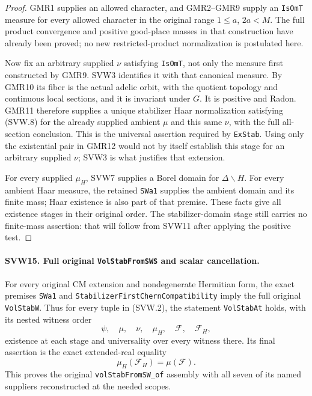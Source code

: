 \begin{proof}
GMR1 supplies an allowed character, and GMR2--GMR9 supply an
\texttt{IsOmT} measure for every allowed character in the original
range $1\leq a$, $2a<M$.  The full product convergence and positive
good-place masses in that construction have already been proved;
no new restricted-product normalization is postulated here.

Now fix an arbitrary supplied $\nu$ satisfying \texttt{IsOmT},
not only the measure first constructed by GMR9.  SVW3 identifies
it with that canonical measure.  By GMR10 its fiber is the actual
adelic orbit, with the quotient topology and continuous local
sections, and it is invariant under $G$.  It is positive and
Radon.  GMR11 therefore supplies a unique stabilizer Haar
normalization satisfying (SVW.8) for the already supplied ambient
$\mu$ and this same $\nu$, with the full all-section conclusion.
This is the universal assertion required by \texttt{ExStab}.
Using only the existential pair in GMR12 would not by itself
establish this stage for an arbitrary supplied $\nu$; SVW3 is what
justifies that extension.

For every supplied $\mu_H$, SVW7 supplies a Borel domain for
$\Delta\backslash H$.  For every ambient Haar measure, the
retained \texttt{SWa1} supplies the ambient domain and its finite
mass; Haar existence is also part of that premise.  These facts
give all existence stages in their original order.  The
stabilizer-domain stage still carries no finite-mass assertion:
that will follow from SVW11 after applying the positive test.
\end{proof}

\paragraph{SVW15. Full original \texttt{VolStabFromSWS} and scalar cancellation.}
\label{claim:SVW15}
For every original CM extension and nondegenerate Hermitian form,
the exact premises \texttt{SWa1} and
\texttt{StabilizerFirstChern}\allowbreak\texttt{Compatibility} imply the full original
\texttt{VolStabW}.  Thus for every tuple in (SVW.2), the statement
\texttt{VolStabAt} holds, with its nested witness order
\[
 \psi,\quad\mu,\quad\nu,\quad\mu_H,\quad
                       \mathcal F,\quad\mathcal F_H,
 \tag{SVW.28}
\]
existence at each stage and universality over every witness there.
Its final assertion is the exact extended-real equality
\[
                         \mu_H(\mathcal F_H)=\mu(\mathcal F).
 \tag{SVW.29}
\]
This proves the original \texttt{volStabFromSW\_of} assembly with
all seven of its named suppliers reconstructed at the needed scopes.

